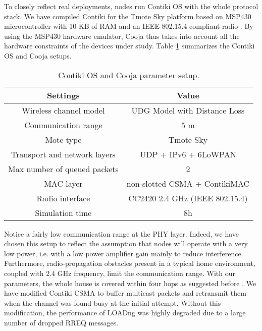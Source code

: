 \documentclass[conference,10pt,a4paper]{IEEEtran}
\begin{document}
To closely reflect real deployments, nodes run Contiki OS with the whole
protocol stack. We have compiled Contiki for the Tmote Sky platform  based on
MSP430 microcontroller with 10 KB of RAM and an IEEE 802.15.4 compliant radio
\cite{tmote-sky}. By using the MSP430 hardware emulator, Cooja thus
takes into account all the hardware constraints of the devices under
study. Table \ref{tab:settings} summarizes the Contiki OS and Cooja
setups.

\begin{table}[htbp]
\centering
\caption{Contiki OS and Cooja parameter setup.\label{tab:settings}
\vspace{-1.5mm}
}
      {
      \begin{tabular}{cc}
        \hline
        {Settings} & {Value}  \\
        \hline
        \hline
        {Wireless channel model} & {UDG Model with Distance Loss}  \\
        \hline
        {Communication range} & {5 m} \\
        \hline
        {Mote type} & {Tmote Sky}  \\
\hline
        {Transport and network layers} & {UDP + IPv6 + 6LoWPAN}  \\
        \hline
        {Max number of queued packets} & {2}  \\
        \hline
        {MAC layer} & {non-slotted CSMA + ContikiMAC}   \\
        \hline
        {Radio interface} & {CC2420 2.4 GHz (IEEE 802.15.4)}  \\
        \hline
        {Simulation time} & {8h}  \\
        \hline
      \end{tabular}      
    } 
\end{table}

Notice a fairly low communication range at the PHY layer. 
Indeed, we have chosen this setup to reflect the assumption that nodes will
operate with a very low power, i.e. with a low power amplifier gain mainly to
reduce interference. Furthermore, radio-propagation obstacles present in a
typical home environment, coupled with 2.4 GHz frequency, limit the
communication range. With our parameters, the whole house is covered
within four hops as suggested before \cite{routingreq-home}. 
We have modified Contiki CSMA to buffer
multicast packets and retransmit them when the channel was found busy at the
initial attempt. Without this modification, the performance of LOADng was highly
degraded due to a large number of dropped RREQ messages. 
\end{document}
